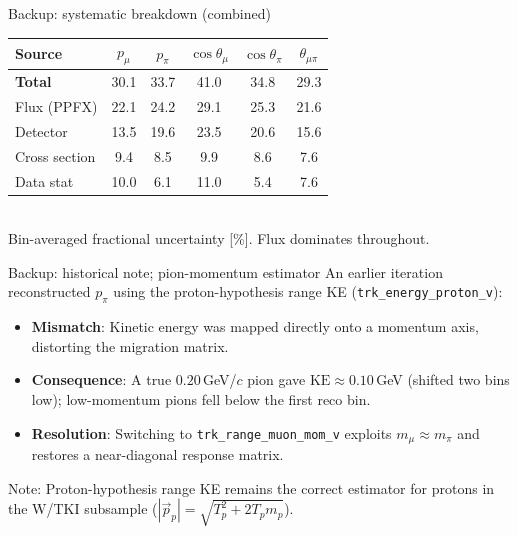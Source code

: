 \documentclass[aspectratio=169,10pt]{beamer}
\begin{document}
{\begin{frame}{Backup: systematic breakdown (combined)}
  \centering\scriptsize
  \begin{tabular}{lccccc}
  \toprule Source & $p_\mu$ & $p_\pi$ & $\cos\theta_\mu$ & $\cos\theta_\pi$ & $\theta_{\mu\pi}$\\\midrule
  \textbf{Total} & 30.1 & 33.7 & 41.0 & 34.8 & 29.3\\
  Flux (PPFX) & 22.1 & 24.2 & 29.1 & 25.3 & 21.6\\
  Detector & 13.5 & 19.6 & 23.5 & 20.6 & 15.6\\
  Cross section & 9.4 & 8.5 & 9.9 & 8.6 & 7.6\\
  Data stat & 10.0 & 6.1 & 11.0 & 5.4 & 7.6\\
  \bottomrule
  \end{tabular}\\[2mm]
  {\scriptsize Bin-averaged fractional uncertainty [\%]. Flux dominates throughout.}
\end{frame}

\begin{frame}{Backup: historical note; pion-momentum estimator}
  \footnotesize
  An earlier iteration reconstructed $p_\pi$ using the \alert{proton-hypothesis range KE} (\texttt{trk\_energy\_proton\_v}):
  \begin{itemize}\setlength\itemsep{2pt}
    \item \textbf{Mismatch}: Kinetic energy was mapped directly onto a momentum axis, distorting the migration matrix.
    \item \textbf{Consequence}: A true $0.20$\,GeV/$c$ pion gave $\mathrm{KE}\approx0.10$\,GeV (shifted two bins low); low-momentum pions fell below the first reco bin.
    \item \textbf{Resolution}: Switching to \texttt{trk\_range\_muon\_mom\_v} exploits $m_\mu \approx m_\pi$ and restores a near-diagonal response matrix.
  \end{itemize}
  \vspace{1mm}
  {\scriptsize Note: Proton-hypothesis range KE remains the correct estimator for \alert{protons} in the W/TKI subsample ($|\vec p_p|=\sqrt{T_p^2+2T_pm_p}$).}
\end{frame}

}
\end{document}
